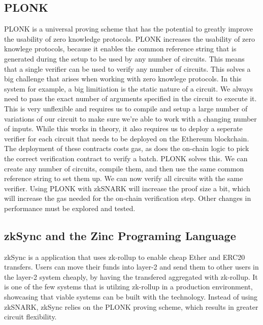 \documentclass[../../thesis.tex]{subfiles}
\begin{document}
\subsection{PLONK}
PLONK \cite{gabizon2019plonk} is a universal proving scheme that has the potential to greatly improve the usability of zero knowledge protocols. PLONK increases the usability of zero knowlege protocols, because it enables the common reference string that is generated during the setup to be used by any number of circuits. This means that a single verifier can be used to verify any number of circuits. This solves a big challenge that arises when working with zero knowlege protocols. In this system for example, a big limitiation is the static nature of a circuit. We always need to pass the exact number of arguments specified in the circuit to execute it. This is very unflexible and requires us to compile and setup a large number of variations of our circuit to make sure we're able to work with a changing number of inputs. While this works in theory, it also requires us to deploy a seperate verifier for each circuit that needs to be deployed on the Ethereum blockchain. The deployment of these contracts costs gas, as does the on-chain logic to pick the correct verification contract to verify a batch. PLONK solves this. We can create any number of circuits, compile them, and then use the same common reference string to set them up. We can now verify all circuits with the same verifier. Using PLONK with zkSNARK will increase the proof size a bit, which will increase the gas needed for the on-chain verification step. Other changes in performance must be explored and tested. 

\subsection{zkSync and the Zinc Programing Language}
zkSync \cite{zkSync_2019} is a application that uses zk-rollup to enable cheap Ether and ERC20 transfers. Users can move their funds into layer-2 and send them to other users in the layer-2 system cheaply, by having the transfered aggregated with zk-rollup. It is one of the few systems that is utilzing zk-rollup in a production environment, showcasing that viable systems can be built with the technology. Instead of using zkSNARK, zkSync relies on the PLONK proving scheme, which results in greater circuit flexibility. 
\end{document}
